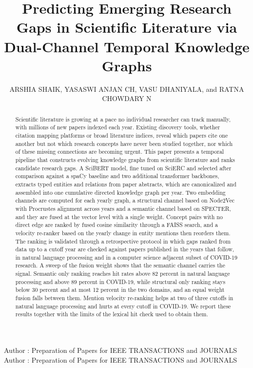 \documentclass{ieeeaccess}
\begin{document}

\title{Predicting Emerging Research Gaps in Scientific Literature via Dual-Channel Temporal Knowledge Graphs}
\author{
\uppercase{Arshia Shaik},
\uppercase{Yasaswi Anjan Ch},
\uppercase{Vasu Dhaniyala},
and \uppercase{Ratna Chowdary N}
}
\address[1]{School of Computer Science and Engineering,
VIT-AP University, Amaravati, Andhra Pradesh, India}



\markboth
{Author \headeretal: Preparation of Papers for IEEE TRANSACTIONS and JOURNALS}
{Author \headeretal: Preparation of Papers for IEEE TRANSACTIONS and JOURNALS}


\begin{abstract}
Scientific literature is growing at a pace no individual researcher can track manually, with millions of new papers indexed each year. Existing discovery tools, whether citation mapping platforms or broad literature indices, reveal which papers cite one another but not which research concepts have never been studied together, nor which of these missing connections are becoming urgent. This paper presents a temporal pipeline that constructs evolving knowledge graphs from scientific literature and ranks candidate research gaps. A SciBERT model, fine tuned on SciERC and selected after comparison against a spaCy baseline and two additional transformer backbones, extracts typed entities and relations from paper abstracts, which are canonicalized and assembled into one cumulative directed knowledge graph per year. Two embedding channels are computed for each yearly graph, a structural channel based on Node2Vec with Procrustes alignment across years and a semantic channel based on SPECTER, and they are fused at the vector level with a single weight. Concept pairs with no direct edge are ranked by fused cosine similarity through a FAISS search, and a velocity re-ranker based on the yearly change in entity mentions then reorders them. The ranking is validated through a retrospective protocol in which gaps ranked from data up to a cutoff year are checked against papers published in the years that follow, in natural language processing and in a computer science adjacent subset of COVID-19 research. A sweep of the fusion weight shows that the semantic channel carries the signal. Semantic only ranking reaches hit rates above 82 percent in natural language processing and above 89 percent in COVID-19, while structural only ranking stays below 30 percent and at most 12 percent in the two domains, and an equal weight fusion falls between them. Mention velocity re-ranking helps at two of three cutoffs in natural language processing and hurts at every cutoff in COVID-19. We report these results together with the limits of the lexical hit check used to obtain them.
\end{abstract}
\end{document}
